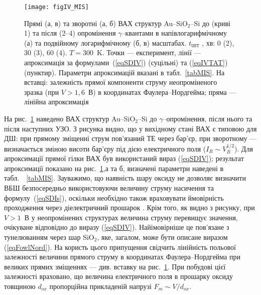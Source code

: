 \begin{figure}
\center
\texttt{[image: figIV\_MIS]}%
\caption{\label{figIV_MIS}
Прямі (а, в) та зворотні (а, б) ВАХ структур Au--SiO$_2$--Si до (криві 1)
та після (2--4) опромінення $\gamma$--квантами в напівлогарифмічному (а)
та подвійному логарифмічному (б, в) масштабах.
$t_\mathtt{UST}$ , хв: 0 (2), 30 (3), 60 (4).
$T=300$~K.
Точки --- експеримент,
лінії --- апроксимація за формулами~(\ref{eqSDIV}) (суцільні) та (\ref{eqIVTAT}) (пунктир).
Параметри апроксимацій вказані в табл.~\ref{tabMIS}.
На вставці:
залежність прямої компоненти струму неопроміненого зразка (при $V>1,6$~В) в координатах Фаулера--Нордгейма;
пряма --- лінійна апроксимація
}%
\end{figure}


На рис.~\ref{figIV_MIS} наведено ВАХ структур  Au--SiO$_2$--Si до $\gamma$--опромінення, після нього та після наступних УЗО.
З рисунка видно, що у вихідному стані ВАХ є типовою для ДШ:
при прямому зміщенні струм пов'язаний ТЕ через бар'єр,
при зворотному --- визначається зміною висоти бар'єру під дією електричного поля ($I_R\sim V_R^{1/2}$).
Для апроксимації прямої гілки ВАХ був використаний вираз (\ref{eqSDIV});
результат апроксимації показано на рис.~\ref{figIV_MIS},а та б, визначені параметри
наведені в табл.~~\ref{tabMIS}.
Зауважимо, що наявність шару оксиду не дозволяє визначити ВБШ безпосередньо використовуючи величину струму насичення та формулу~(\ref{eqSDIs}), оскільки необхідно також враховувати ймовірність проходження через діелектричний прошарок \cite{OZBEK2011,Kobayashi}.
Крім того, як видно з рисунку, при $V>1$~В у неопромінених структурах величина струму перевищує значення, очікуване відповідно до виразу (\ref{eqSDIV}).
Найімовірніше це пов'язане з тунелюванням через шар SiO$_2$, яке, загалом, може бути описане виразом (\ref{eqFowlNord}).
На користь цього припущення свідчить лінійність польової залежності величини прямого струму в координатах Фаулера--Нордгейма при великих прямих зміщеннях --- див. вставку на рис.~\ref{figIV_MIS}.
При побудові цієї залежності враховано, що величина електричного поля в прошарку оксиду товщиною $d_{ox}$ пропорційна прикладеній напрузі $F_m\sim V/d_{ox}$.







